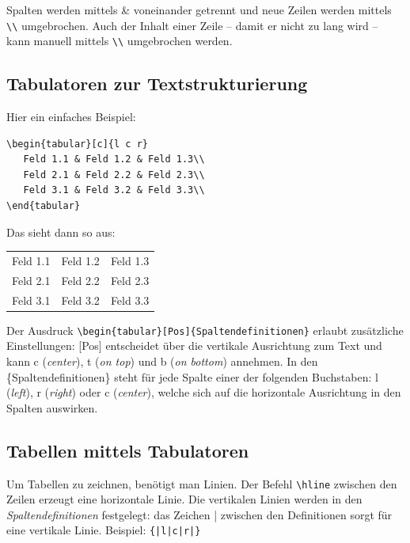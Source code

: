 \documentclass[
	10pt,
	parskip=half-,		%
	paper=a4,			%
	english, ngerman		%
	]{scrartcl}			%
\begin{document}
Spalten werden mittels \& voneinander getrennt und neue Zeilen werden mittels \verb|\\| umgebrochen. Auch der Inhalt einer Zeile -- damit er nicht zu lang wird -- kann manuell mittels \verb|\\| umgebrochen werden.

\subsection{Tabulatoren zur Textstrukturierung}
Hier ein einfaches Beispiel:

\begin{verbatim}
\begin{tabular}[c]{l c r}
   Feld 1.1 & Feld 1.2 & Feld 1.3\\
   Feld 2.1 & Feld 2.2 & Feld 2.3\\
   Feld 3.1 & Feld 3.2 & Feld 3.3\\
\end{tabular}
\end{verbatim}

Das sieht dann so aus:

\begin{tabular}%
	[c]%
	{l c r}%
	
	Feld 1.1 & Feld 1.2 & Feld 1.3\\	%
	Feld 2.1 & Feld 2.2 & Feld 2.3\\ %
	Feld 3.1 & Feld 3.2 & Feld 3.3\\
\end{tabular}

Der Ausdruck \verb|\begin{tabular}[Pos]{Spaltendefinitionen}| erlaubt zusätzliche Einstellungen: [Pos] entscheidet über die vertikale Ausrichtung zum Text und kann c (\emph{center}), t (\emph{on top}) und b (\emph{on bottom}) annehmen. In den \{Spaltendefinitionen\} steht für jede Spalte einer der folgenden Buchstaben: l (\emph{left}), r (\emph{right}) oder c (\emph{center}), welche sich auf die horizontale Ausrichtung in den Spalten auswirken.

\subsection{Tabellen mittels Tabulatoren}
Um Tabellen zu zeichnen, benötigt man Linien. Der Befehl \verb|\hline| zwischen den Zeilen erzeugt eine horizontale Linie. Die vertikalen Linien werden in den \emph{Spaltendefinitionen} festgelegt: das Zeichen | zwischen den Definitionen sorgt für eine vertikale Linie. Beispiel: \verb={|l|c|r|}=
\end{document}
